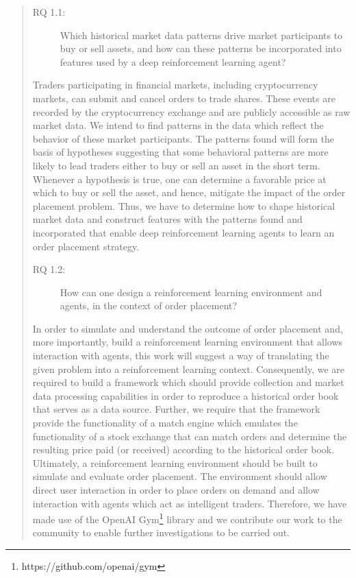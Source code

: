 \begin{quote}
\begin{description}
    \item[RQ 1.1:] Which historical market data patterns drive market participants to buy or sell assets, and how can these patterns be incorporated into features used by a deep reinforcement learning agent?
\end{description}
    Traders participating in financial markets, including cryptocurrency markets, can submit and cancel orders to trade shares.
    These events are recorded by the cryptocurrency exchange and are publicly accessible as raw market data.
    We intend to find patterns in the data which reflect the behavior of these market participants.
    The patterns found will form the basis of hypotheses suggesting that some behavioral patterns are more likely to lead traders either to buy or sell an asset in the short term.
    Whenever a hypothesis is true, one can determine a favorable price at which to buy or sell the asset, and hence, mitigate the impact of the order placement problem.
    Thus, we have to determine how to shape historical market data and construct features with the patterns found and incorporated that enable deep reinforcement learning agents to learn an order placement strategy.

\begin{description}
    \item[RQ 1.2:] How can one design a reinforcement learning environment and agents, in the context of order placement?
\end{description}
    In order to simulate and understand the outcome of order placement and, more importantly, build a reinforcement learning environment that allows interaction with agents, this work will suggest a way of translating the given problem into a reinforcement learning context.
    Consequently, we are required to build a framework which should provide collection and market data processing capabilities in order to reproduce a historical order book that serves as a data source.
    Further, we require that the framework provide the functionality of a match engine which emulates the functionality of a stock exchange that can match orders and determine the resulting price paid (or received) according to the historical order book.
    Ultimately, a reinforcement learning environment should be built to simulate and evaluate order placement.
    The environment should allow direct user interaction in order to place orders on demand and allow interaction with agents which act as intelligent traders.
    Therefore, we have made use of the OpenAI Gym\footnote{https://github.com/openai/gym} library and we contribute our work to the community to enable further investigations to be carried out.
    

\end{quote}
